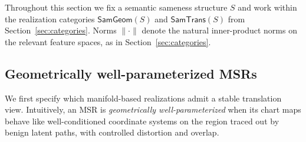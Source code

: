\documentclass[11pt]{article}
\newcommand{\SamTrans}{\mathsf{SamTrans}}
\newcommand{\SamGeom}{\mathsf{SamGeom}}
\begin{document}
Throughout this section we fix a semantic sameness structure $S$ and work
within the realization categories $\SamGeom(S)$ and $\SamTrans(S)$
from Section~\ref{sec:categories}. Norms $\|\cdot\|$ denote the natural inner-product
norms on the relevant feature spaces, as in Section~\ref{sec:categories}.

\subsection{Geometrically well-parameterized MSRs}
\label{subsec:geom-well-param}

We first specify which manifold-based realizations admit a stable translation
view. Intuitively, an MSR is \emph{geometrically well-parameterized} when its
chart maps behave like well-conditioned coordinate systems on the region
traced out by benign latent paths, with controlled distortion and overlap.
\end{document}
